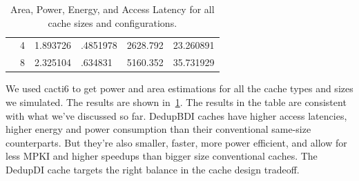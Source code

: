 \begin{table}[]
{\begin{tabular}{llllll}
    \multicolumn{1}{c|}{}                          & \multicolumn{1}{l|}{4}   & 1.893726                                                                          & .4851978                                                                               & 2628.792                                                                         & 23.260891                      \\
    \multicolumn{1}{c|}{}                          & \multicolumn{1}{l|}{8}   & 2.325104                                                                          & .634831                                                                                & 5160.352                                                                         & 35.731929                      \\ \cline{1-2}
    \end{tabular}%
    }
    \caption{Area, Power, Energy, and Access Latency for all cache sizes and configurations.}
    \label{tab:areapower}
\end{table}
We used cacti6\cite{cacti} to get power and area estimations for all the cache types and sizes we simulated. The results are shown in~\ref{tab:areapower}. The results in the table are consistent with what we've discussed so far. DedupBDI caches have higher access latencies, higher energy and power consumption than their conventional same-size counterparts. But they're also smaller, faster, more power efficient, and allow for less MPKI and higher speedups than bigger size conventional caches. The DedupDI cache targets the right balance in the cache design tradeoff.